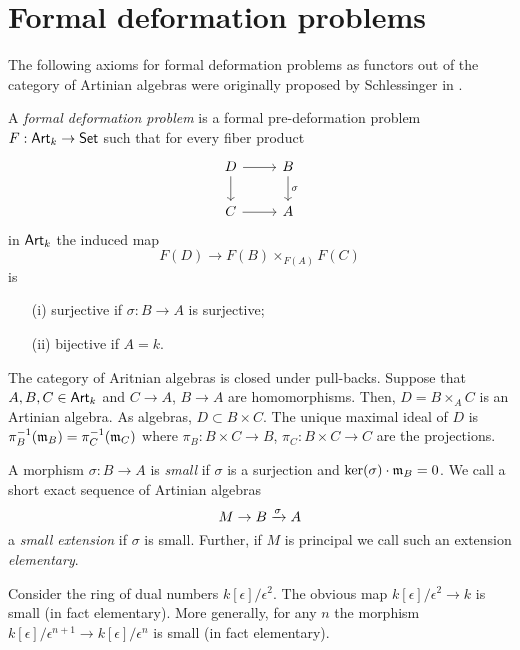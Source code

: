 \documentclass[11pt]{amsart}
\begin{document}
\section{Formal deformation problems}

The following axioms for formal deformation problems as functors out of the category of Artinian algebras were originally proposed by Schlessinger in \cite{Sch}. 

\begin{dfn}\label{dfn: def}
A {\em formal deformation problem} is a formal pre-deformation problem $F : {\sf Art}_k \to {\sf Set}$ such that for every fiber product
\[
\begin{tikzcd}
D \ar[d] \ar[r] & B \ar[d, "\sigma"] \\
C \ar[r] & A 
\end{tikzcd}
\]
in ${\sf Art}_k$ the induced map
\[
F(D) \to F(B) \times_{F(A)} F(C)
\]
is
\begin{enumerate}
\item[(i)] surjective if $\sigma : B \to A$ is surjective;
\item[(ii)] bijective if $A = k$.
\end{enumerate}
\end{dfn}

\begin{rmk}
The category of Aritnian algebras is closed under pull-backs. 
Suppose that $A,B,C \in {\sf Art}_k$ and $C \to A$, $B \to A$ are homomorphisms.
Then, $D = B \times_A C$ is an Artinian algebra. 
As algebras, $D \subset B \times C$. 
The unique maximal ideal of $D$ is $\pi_B^{-1}({\mathfrak m}_B) = \pi_C^{-1}({\mathfrak m}_C)$ where $\pi_B : B \times C \to B$, $\pi_C : B \times C \to C$ are the projections. 
\end{rmk}

\begin{dfn}
A morphism $\sigma : B \to A$ is {\em small} if $\sigma$ is a surjection and $\ker(\sigma) \cdot {\mathfrak m}_B = 0$. 
We call a short exact sequence of Artinian algebras
\[
M \to B \xrightarrow{\sigma} A
\]
a {\em small extension} if $\sigma$ is small. 
Further, if $M$ is principal we call such an extension {\em elementary}. 
\end{dfn}

\begin{eg}
Consider the ring of dual numbers $k[\epsilon] / \epsilon^2$. 
The obvious map $k[\epsilon] / \epsilon^2 \to k$ is small (in fact elementary). 
More generally, for any $n$ the morphism $k[\epsilon]/\epsilon^{n+1} \to k[\epsilon]/\epsilon^n$ is small (in fact elementary). 
\end{eg}
\end{document}
